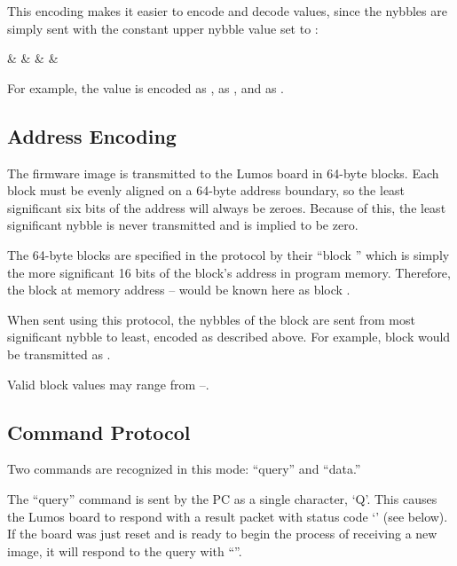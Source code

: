 \documentclass[letterpaper,twoside,onecolumn,openright,final]{memoir}
\begin{document}
This encoding makes it easier to encode and decode values, since the nybbles
are simply sent with the constant upper nybble value set to :
\begin{BF}
	&  
	&  
	&  
	& 
\end{BF}

For example, the value  is encoded as ,  as ,
and  as .

\subsection{Address Encoding}\label{ss:blockid}
The firmware image is transmitted to the Lumos board in 64-byte blocks.  Each
block must be evenly aligned on a 64-byte address boundary, so
the least significant six bits of the address will always be zeroes.  Because
of this, the least significant nybble is never transmitted and is implied to
be zero.  

The 64-byte blocks are specified in the protocol by their ``block '' which is simply the more significant 16 bits of the block's address in
program memory.  Therefore, the block at memory address --
would be known here as block  .

When sent using this protocol, the nybbles of the block  are 
sent from most significant nybble to least, encoded as described above.
For example, block  would be transmitted as .

Valid block  values may range from --.

\subsection{Command Protocol}
Two commands are recognized in this mode: ``query'' and ``data.''

The ``query'' command is sent by the PC as a single character, `\z Q'.
This causes the Lumos board to respond with a result packet with status
code `\z*' (see below).  If the board was just reset and is ready to begin
the process of receiving a new image, it will respond to the query
with ``''.
\end{document}
